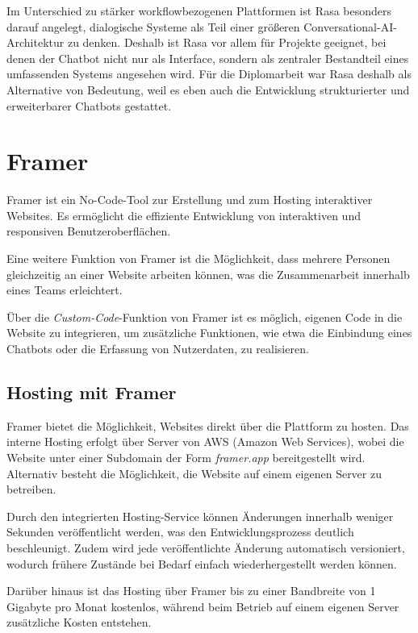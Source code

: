 Im Unterschied zu stärker workflowbezogenen Plattformen ist Rasa besonders darauf 
angelegt, dialogische Systeme als Teil einer größeren 
Conversational-AI-Architektur zu denken. Deshalb ist Rasa vor allem für Projekte 
geeignet, bei denen der Chatbot nicht nur als Interface, sondern als zentraler 
Bestandteil eines umfassenden Systems angesehen wird. Für die Diplomarbeit war 
Rasa deshalb als Alternative von Bedeutung, weil es eben auch die Entwicklung 
strukturierter und erweiterbarer Chatbots gestattet.

\setauthor{\firstauthor}
\section{Framer}
Framer ist ein No-Code-Tool zur Erstellung und zum Hosting interaktiver Websites.
Es ermöglicht die effiziente Entwicklung von interaktiven und responsiven Benutzeroberflächen.

Eine weitere Funktion von Framer ist die Möglichkeit, dass mehrere
Personen gleichzeitig an einer Website arbeiten können, was 
die Zusammenarbeit innerhalb eines Teams erleichtert.

Über die \textit{Custom-Code}-Funktion von Framer ist es möglich,
eigenen Code in die Website zu integrieren, um zusätzliche Funktionen, 
wie etwa die Einbindung eines Chatbots oder die Erfassung von Nutzerdaten, zu 
realisieren.

\setauthor{\firstauthor}
\subsection{Hosting mit Framer}
Framer bietet die Möglichkeit, Websites direkt über die Plattform zu hosten.
Das interne Hosting erfolgt über Server von AWS (Amazon Web Services), 
wobei die Website unter einer Subdomain der Form \textit{framer.app} bereitgestellt wird.
Alternativ besteht die Möglichkeit, die Website auf einem eigenen Server zu betreiben.

Durch den integrierten Hosting-Service können Änderungen innerhalb weniger Sekunden
veröffentlicht werden, was den Entwicklungsprozess deutlich beschleunigt.
Zudem wird jede veröffentlichte Änderung automatisch versioniert,
wodurch frühere Zustände bei Bedarf einfach wiederhergestellt werden können.

Darüber hinaus ist das Hosting über Framer bis zu einer Bandbreite von
1 Gigabyte pro Monat kostenlos,
während beim Betrieb auf einem eigenen Server zusätzliche Kosten entstehen.

